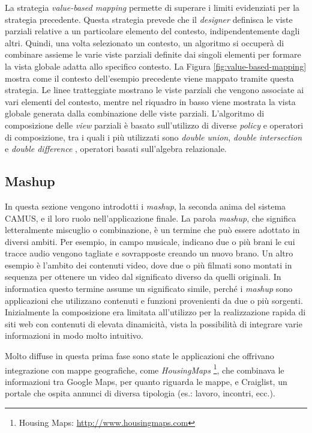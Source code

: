 La strategia \emph{value-based mapping} permette di superare i limiti evidenziati per la strategia precedente. Questa strategia prevede che il \emph{designer} definisca le viste parziali relative a un particolare elemento del contesto, indipendentemente dagli altri. Quindi, una volta selezionato un contesto, un algoritmo si occuperà di combinare assieme le varie viste parziali definite dai singoli elementi per formare la vista globale adatta allo specifico contesto. La Figura \ref{fig:value-based-mapping} mostra come il contesto dell'esempio precedente viene mappato tramite questa strategia. Le linee tratteggiate mostrano le viste parziali che vengono associate ai vari elementi del contesto, mentre nel riquadro in basso viene mostrata la vista globale generata dalla combinazione delle viste parziali. L'algoritmo di composizione delle \emph{view} parziali è basato sull'utilizzo di diverse \emph{policy} e operatori di composizione, tra i quali i più utilizzati sono \emph{double union}, \emph{double intersection} e \emph{double difference} \cite{DBLP:conf/er/BolchiniQR07}, operatori basati sull'algebra relazionale.

\subsection{Mashup\label{sec:mashup}}

In questa sezione vengono introdotti i \emph{mashup}, la seconda anima del sistema CAMUS, e il loro ruolo nell'applicazione finale.
La parola \emph{mashup}, che significa letteralmente miscuglio o combinazione, è un termine che può essere adottato in diversi ambiti.
Per esempio, in campo musicale, indicano due o più brani le cui tracce audio vengono tagliate e sovrapposte creando un nuovo brano. Un altro esempio è l'ambito dei contenuti video, dove due o più filmati sono montati in sequenza per ottenere un video dal significato diverso da quelli originali.
In informatica questo termine assume un significato simile, perché i \emph{mashup} sono applicazioni che utilizzano contenuti e funzioni provenienti da due o più sorgenti\cite{DBLP:books/sp/DanielM14}.
Inizialmente la composizione era limitata all'utilizzo per la realizzazione rapida di siti web con contenuti di elevata dinamicità, vista la possibilità di integrare varie informazioni in modo molto intuitivo.

Molto diffuse in questa prima fase sono state le applicazioni che offrivano integrazione con mappe geografiche, come \emph{HousingMaps} \footnote{Housing Maps: \url{http://www.housingmaps.com}}, che combinava le informazioni tra Google Maps, per quanto riguarda le mappe, e Craiglist, un portale che ospita annunci di diversa tipologia (es.: lavoro, incontri, ecc.).

